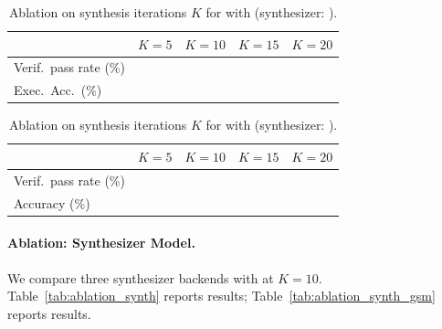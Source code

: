 \begin{table}[t]
\centering
\caption{Ablation on synthesis iterations $K$ for \Spider with \QwenCoder (synthesizer: \SynthGPT).}
\label{tab:ablation_iter_spider}
\small
\begin{tabular}{@{}l cccc@{}}
\toprule
& $K=5$ & $K=10$ & $K=15$ & $K=20$ \\
\midrule
Verif.\ pass rate (\%) & \todo{--} & \todo{--} & \todo{--} & \todo{--} \\
Exec.\ Acc.\ (\%)      & \todo{--} & \todo{--} & \todo{--} & \todo{--} \\
\bottomrule
\end{tabular}

\vspace{6pt}

\caption{Ablation on synthesis iterations $K$ for \GSM with \QwenCoder (synthesizer: \SynthGPT).}
\label{tab:ablation_iter_gsm}
\small
\begin{tabular}{@{}l cccc@{}}
\toprule
& $K=5$ & $K=10$ & $K=15$ & $K=20$ \\
\midrule
Verif.\ pass rate (\%) & \todo{--} & \todo{--} & \todo{--} & \todo{--} \\
Accuracy (\%)          & \todo{--} & \todo{--} & \todo{--} & \todo{--} \\
\bottomrule
\end{tabular}
\end{table}

\paragraph{Ablation: Synthesizer Model.}
We compare three synthesizer backends with \QwenCoder at $K=10$.
Table~\ref{tab:ablation_synth} reports \Spider results; Table~\ref{tab:ablation_synth_gsm} reports \GSM results.

